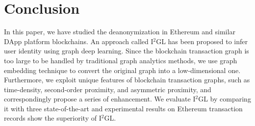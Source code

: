 
\section{Conclusion}
\label{sec:conclusion}
In this paper, we have studied the deanonymization in Ethereum and similar DApp platform blockchains. An approach called I$^2$GL has been proposed to infer user identity using graph deep learning. Since the blockchain transaction graph is too large to be handled by traditional graph analytics methods, we use graph embedding technique to convert the original graph into a low-dimensional one. Furthermore, we exploit unique features of blockchain transaction graphs, such as time-density, second-order proximity, and asymmetric proximity, and correspondingly propose a series of enhancement. We evaluate I$^2$GL by comparing it with three state-of-the-art and experimental results on Ethereum transaction records show the superiority of I$^2$GL.